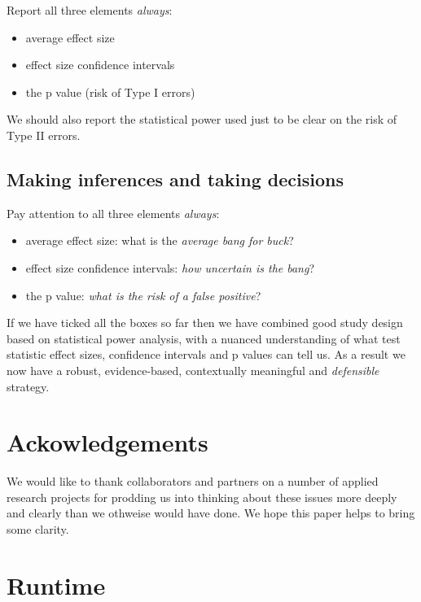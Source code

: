 \documentclass[]{article}
\providecommand{\tightlist}{%
  \setlength{\itemsep}{0pt}\setlength{\parskip}{0pt}}
\theoremstyle{definition}
\theoremstyle{definition}
\theoremstyle{definition}
\theoremstyle{remark}
\begin{document}
Report all three elements \emph{always}:

\begin{itemize}
\tightlist
\item
  average effect size
\item
  effect size confidence intervals
\item
  the p value (risk of Type I errors)
\end{itemize}

We should also report the statistical power used just to be clear on the
risk of Type II errors.

\subsection{Making inferences and taking
decisions}\label{making-inferences-and-taking-decisions}

Pay attention to all three elements \emph{always}:

\begin{itemize}
\tightlist
\item
  average effect size: what is the \emph{average bang for buck}?
\item
  effect size confidence intervals: \emph{how uncertain is the bang}?
\item
  the p value: \emph{what is the risk of a false positive}?
\end{itemize}

If we have ticked all the boxes so far then we have combined good study
design based on statistical power analysis, with a nuanced understanding
of what test statistic effect sizes, confidence intervals and p values
can tell us. As a result we now have a robust, evidence-based,
contextually meaningful and \emph{defensible} strategy.

\section{Ackowledgements}\label{ackowledgements}

We would like to thank collaborators and partners on a number of applied
research projects for prodding us into thinking about these issues more
deeply and clearly than we othweise would have done. We hope this paper
helps to bring some clarity.

\section{Runtime}\label{runtime}
\end{document}

